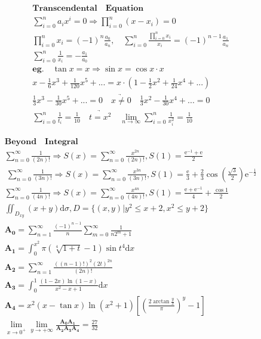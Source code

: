 \documentclass{article}
\begin{document}
\clearpage
\begin{align*}
    \bm{Transcendental \quad Equation} \\ 
    \sum_{i=0}^{n}a_{i}x^i = 0 \Longrightarrow \prod_{i=0}^{n}(x-x_{i})=0 \\ 
    \prod_{i=0}^{n}x_{i} = (-1)^{n}\frac{a_{0}}{a_{n}},\quad \sum_{i=0}^{n}\frac{\prod_{i=0}^{n}x_{i}}{x_{i}} = (-1)^{n-1}\frac{a_{1}}{a_{n}} \\ 
    \sum_{i=0}^{n}\frac{1}{x_{i}} = -\frac{a_{1}}{a_{0}} \\ 
    \bm{eg.} \quad \tan x = x \Longrightarrow \sin{x} = \cos{x} \cdot x \\
    x - \frac{1}{6}x^3 + \frac{1}{120}x^5 +... = x \cdot (1-\frac{1}{2}x^2+\frac{1}{24}x^4+...) \\
    \frac{1}{3}x^3-\frac{1}{30}x^5+... = 0 \quad \underrightarrow{x \not= 0} \quad \frac{1}{3}x^2-\frac{1}{30}x^4+... = 0 \\
    \sum_{i=0}^{n}\frac{1}{t_{i}} = \frac{1}{10} \quad \underrightarrow{t = x^2} \quad \lim_{n \to \infty}\sum_{i=0}^{n}\frac{1}{x_{i}^2} = \frac{1}{10} 
\end{align*}

\clearpage

\begin{align*}
    \bm{Beyond \quad Integral} \\
    \sum_{n=0}^\infty \frac{1}{(2n)!} \Longrightarrow S(x) = \sum_{n=0}^{\infty}{\frac{x^{2n}}{(2n)!}} ,S(1) = \frac{\mathrm{e}^{-1}+\mathrm{e}}{2}\\\ 
    \sum_{n=0}^\infty \frac{1}{(3n)!} \Longrightarrow S(x) = \sum_{n=0}^{\infty}{\frac{x^{3n}}{(3n)!}} ,S(1) = \frac{\mathrm{e}}{3}+\frac{2}{3}\cos\left(\frac{\sqrt{3}}{2}\right)\mathrm{e}^{-\frac{1}{2}} \\ 
    \sum_{n=0}^{\infty} \frac{1}{(4n)!} \Longrightarrow S(x) = \sum_{n=0}^{\infty}{\frac{x^{4n}}{(4n)!}} ,S(1) = \frac{\mathrm{e}+\mathrm{e}^{-1}}{4}+\frac{\cos 1}{2} \\
    \iint_{D_{xy}} (x+y)\mathrm{d}\sigma , D=\{(x,y)|y^2 \le x+2, x^2 \le y+2\} \\
    \bm{A_{0}} = \sum_{n=1}^\infty\frac{(-1)^{n-1}}{n}\sum_{m=0}^\infty\frac{1}{n2^m+1} \\
    \bm{A_{1}} = \int_{0}^{x^2} \pi(\sqrt[4]{1+t}-1)\sin t^4 \mathrm{d}x\\ 
    \bm{A_{2}} = \sum_{n=1}^\infty \frac{((n-1)!)^2(2t)^{2n}}{(2n)!} \\
    \bm{A_{3}} = \int_{0}^1\frac{(1-2x)\ln(1-x)}{x^2-x+1}\mathrm{d}x\\
    \bm{A_{4}} = x^2(x-\tan x)\ln(x^2+1)[\left(\frac{2\arctan \frac{y}{x}}{\pi}\right)^y-1] \\ 
    \lim_{x \to 0^{+}} \lim_{y \to +\infty}\frac{\bm{A_{0}}\bm{A_{1}}}{\bm{A_{2}}\bm{A_{3}}\bm{A_{4}}} = \frac{27}{32}\\
\end{align*}
\end{document}
